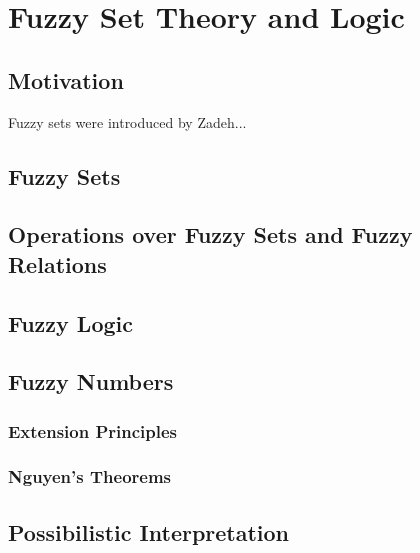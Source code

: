 \chapter{Fuzzy Set Theory and Logic}
\section*{Motivation}
Fuzzy sets were introduced by Zadeh...

\section{Fuzzy Sets}

\section{Operations over Fuzzy Sets and Fuzzy Relations}

\section{Fuzzy Logic}
\section{Fuzzy Numbers}\label{sec:fuzzy_numbers}

\subsection{Extension Principles}
\subsection{Nguyen's Theorems}
\section{Possibilistic Interpretation}